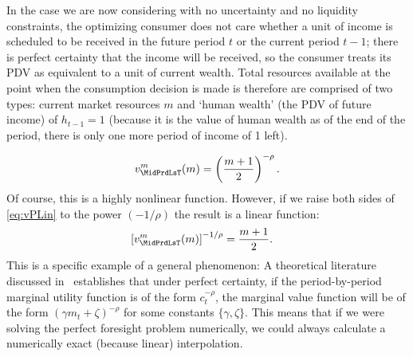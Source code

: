 In the case we are now considering with no uncertainty and no liquidity constraints, the optimizing consumer does not care whether a unit of income is scheduled to be received in the future period $t$ or the current period $t-1$; there is perfect certainty that the income will be received, so the consumer treats its PDV as equivalent to a unit of current wealth.  Total resources available at the point when the consumption decision is made is therefore are comprised of two types: current market resources $m$ and `human wealth' (the PDV of future income) of $h_{t-1}=1$ (because it is the value of human wealth as of the end of the period, there is only one more period of income of 1 left).

\begin{equation}
  v^{m}_{\MidPrdLsT}(m)  = \left(\frac{m+1}{2}\right)^{-\rho} \label{eq:vPLin}.
\end{equation}
Of course, this is a highly nonlinear function.  However, if we raise both sides of \eqref{eq:vPLin} to the power $(-1/\rho)$ the result is a linear function:
\begin{equation}\begin{gathered}\begin{aligned}
      \left[v^{m}_{\MidPrdLsT}(m)\right]^{-1/\rho}  & = \frac{m+1}{2}  .
    \end{aligned}\end{gathered}\end{equation}
This is a specific example of a general phenomenon: A theoretical literature discussed in~\cite{ckConcavity} establishes that under perfect certainty, if the period-by-period marginal utility function is of the form $c_{t}^{-\rho}$, the marginal value function will be of the form $(\gamma m_{t}+\zeta)^{-\rho}$ for some constants $\{\gamma,\zeta\}$.  This means that if we were solving the perfect foresight problem numerically, we could always calculate a numerically exact (because linear) interpolation.


